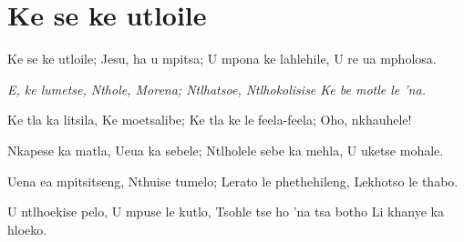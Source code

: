 \starttocol
\chapter{Ke se ke utloile}
\nexttocol
\hfill{\it }
\stoptocol
\starttocol
\startlines
{\sc Ke} se ke utloile;
Jesu, ha u mpitsa;
U mpona ke lahlehile,
U re ua mpholosa.

{\it 
E, ke lumetse, 
Nthole, Morena;
Ntlhatsoe, Ntlhokolisise
Ke be motle le 'na.}

Ke tla ka litsila,
Ke moetsalibe;
Ke tla ke le feela-feela;
Oho, nkhauhele!

Nkapese ka matla,
Ueua ka sebele;
Ntlholele sebe ka mehla, 
U uketse mohale. 

Uena ea mpitsitseng,
Nthuise tumelo;
Lerato le phethehileng,
Lekhotso le thabo.

U ntlhoekise pelo,
U mpuse le kutlo,
Tsohle tse ho 'na tsa botho
Li khanye ka hloeko.

\stoplines
\nexttocol

\stoptocol

